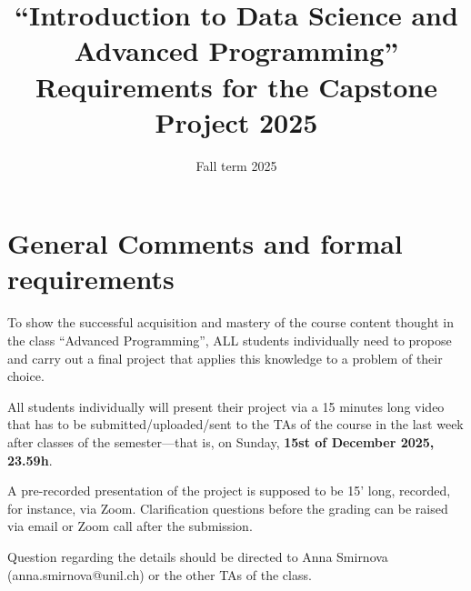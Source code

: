 \documentclass[12pt]{article} %
\title{``Introduction to Data Science and Advanced Programming''\\ Requirements for the Capstone Project 2025}
\date{Fall term 2025}
\begin{document}

\maketitle


\section{General Comments and formal requirements}

To show the successful acquisition and mastery of the course content thought in the class
``Advanced Programming'', ALL students individually need to propose and carry out a final project
that applies this knowledge to a problem of their choice.

All students individually will present their project via a 15 minutes long video that has to be submitted/uploaded/sent to the TAs of the course in the last week after classes of the semester---that is, on Sunday, {\bf{15st of December 2025, 23.59h}}.


A pre-recorded presentation of the project is supposed to be 15' long, recorded, for instance, via Zoom.
Clarification questions before the grading can be raised via email or Zoom call after the submission. 

Question regarding the details should be directed to Anna Smirnova (anna.smirnova@unil.ch) or the other TAs of the class.
\end{document}

